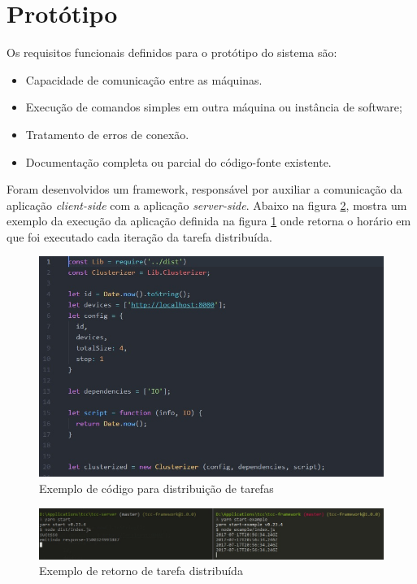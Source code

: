 \section{Protótipo}
Os requisitos funcionais definidos para o protótipo do sistema são:

\begin{itemize}
  \item Capacidade de comunicação entre as máquinas.
  \item Execução de comandos simples em outra máquina ou instância de software;
  \item Tratamento de erros de conexão.
  \item Documentação completa ou parcial do código-fonte existente.
\end{itemize}

Foram desenvolvidos um framework, responsável por auxiliar a comunicação da
aplicação \emph{client-side} com a aplicação \emph{server-side}. Abaixo na
figura \ref{fig:prototipo-resultado}, mostra um exemplo da execução da aplicação
definida na figura \ref{fig:prototipo-trecho-fonte} onde retorna
o horário em que foi executado cada iteração da tarefa distribuída.

\begin{figure}[htb]
	\caption{\label{fig:prototipo-trecho-fonte}Exemplo de código para
  distribuição de tarefas}
	\begin{center}
		\includegraphics[width=1\textwidth]{img/prototipo-trecho-fonte.jpg}
	\end{center}
\end{figure}

\begin{figure}[htb]
	\caption{\label{fig:prototipo-resultado}Exemplo de retorno de tarefa
  distribuída}
	\begin{center}
		\includegraphics[width=1\textwidth]{img/prototipo-resultado.jpg}
	\end{center}
\end{figure}
